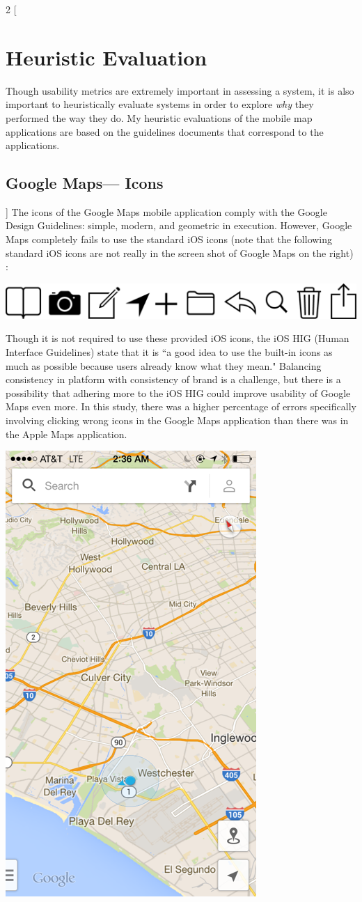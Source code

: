 \documentclass[a4paper; 11pt]{article}
\begin{document}
\begin{multicols}{2}
[
\section{Heuristic Evaluation}
Though usability metrics are extremely important in assessing a system, it is also important to heuristically evaluate systems in order to explore \textit{why} they performed the way they do.
My heuristic evaluations of the mobile map applications are based on the guidelines documents that correspond to the applications.
\subsection{Google Maps--- Icons}
]
The icons of the Google Maps mobile application comply with the Google Design Guidelines\cite{Google}: simple, modern, and geometric in execution. However, Google Maps completely fails to use the standard iOS icons\cite{Apple} (note that the following standard iOS icons are not really in the screen shot of Google Maps on the right) :
\begin{center}
\includegraphics[width=.35\textwidth]{ios-bar-icons.png}
\end{center}
Though it is not required to use these provided iOS icons, the iOS HIG (Human Interface Guidelines) state that it is ``a good idea to use the built-in icons as much as possible because users already know what they mean."\cite{Apple} Balancing consistency in platform with consistency of brand is a challenge, but there is a possibility that adhering more to the iOS HIG could improve usability of Google Maps even more. In this study, there was a higher percentage of errors specifically involving clicking wrong icons in the Google Maps application than there was in the Apple Maps application. 
\begin{center}
\includegraphics[width=.5\textwidth]{google-maps.png}
\end{center}
\end{multicols}
\end{document}
